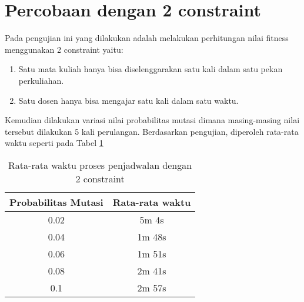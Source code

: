 \section{Percobaan dengan 2 constraint}
\label{sec:pengujian 2}
Pada pengujian ini yang dilakukan adalah melakukan perhitungan nilai fitness menggunakan 2 constraint yaitu:
\begin{enumerate}[nolistsep]
  \item Satu mata kuliah hanya bisa diselenggarakan satu kali dalam satu pekan perkuliahan.
  \item Satu dosen hanya bisa mengajar satu kali dalam satu waktu.
\end{enumerate} 
Kemudian dilakukan variasi nilai probabilitas mutasi dimana masing-masing nilai tersebut dilakukan 5 kali perulangan. 
Berdasarkan pengujian, diperoleh rata-rata waktu seperti pada Tabel \ref{tab:2 constraint}
\begin{longtable}[c]{|c|c|}
  \caption{Rata-rata waktu proses penjadwalan dengan 2 constraint}
  \label{tab:2 constraint}\\
  \hline
  \rowcolor[HTML]{C0C0C0} 
  Probabilitas Mutasi & Rata-rata waktu \\ \hline
  0.02                & 5m 4s           \\ \hline
  0.04                & 1m 48s          \\ \hline
  0.06                & 1m 51s          \\ \hline
  0.08                & 2m 41s          \\ \hline
  0.1                 & 2m 57s          \\ \hline
  \end{longtable}

